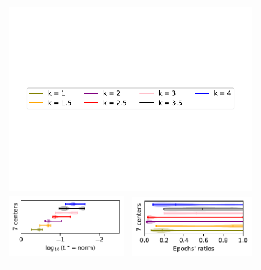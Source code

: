 \documentclass[12pt]{report} %
\begin{document}
\begin{figure}[H]
  \begin{tabular}{rl}
    \multicolumn{2}{c}{{\includegraphics[width=.7\textwidth, trim={0.5cm 4cm .5cm 3.8cm},clip=true]
          {imagenes/experiments/1d/statistical_1d_full/runge_function/runge_function_legend.pdf}}} \\ 
    {\includegraphics[width=.5\textwidth, trim={0 1.25cm 0 0},clip=true]
    {imagenes/experiments/1d/statistical_1d_full/gibbs_function/linf_gibbs_function_C7_gaussian_kernel.pdf}}  & 
    {\includegraphics[width=.44\textwidth, trim={.7cm 1.15cm 0 0},clip=true]
    {imagenes/experiments/1d/statistical_1d_full/gibbs_function/epochs_gibbs_function_C7_gaussian_kernel.pdf}}                                                                                      \\
    {\includegraphics[width=.5\textwidth, trim={0 1.25cm 0 0},clip=true]
}
\end{tabular}
\end{figure}
\end{document}

